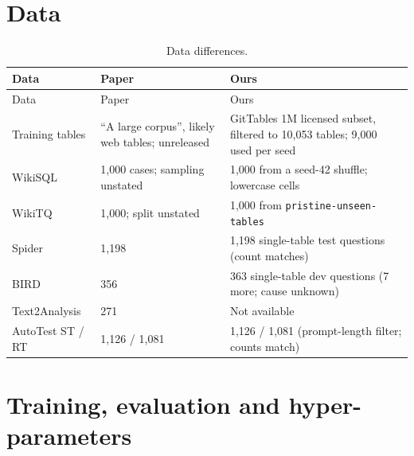 \section{Data}

{\small
{}
\begin{longtable}{@{}p{3.0cm}p{5.4cm}p{6.2cm}@{}}
\caption{Data differences.}\label{tab:data-diff}\\
\toprule\rowcolor{headshade}Data & Paper & Ours\\\midrule\endfirsthead
\toprule\rowcolor{headshade}Data & Paper & Ours\\\midrule\endhead
\bottomrule\endfoot
Training tables & ``A large corpus'', likely web tables; unreleased & GitTables 1M licensed subset, filtered to 10,053
tables; 9,000 used per seed\\
WikiSQL & 1,000 cases; sampling unstated & 1,000 from a seed-42 shuffle; lowercase cells\\
WikiTQ & 1,000; split unstated & 1,000 from \texttt{pristine-unseen-tables}\\
Spider & 1,198 & 1,198 single-table test questions (count matches)\\
BIRD & 356 & 363 single-table dev questions (7 more; cause unknown)\\
Text2Analysis & 271 & Not available\\
AutoTest ST / RT & 1,126 / 1,081 & 1,126 / 1,081 (prompt-length filter; counts match)\\
\end{longtable}
}

\section{Training, evaluation and hyper-parameters}

